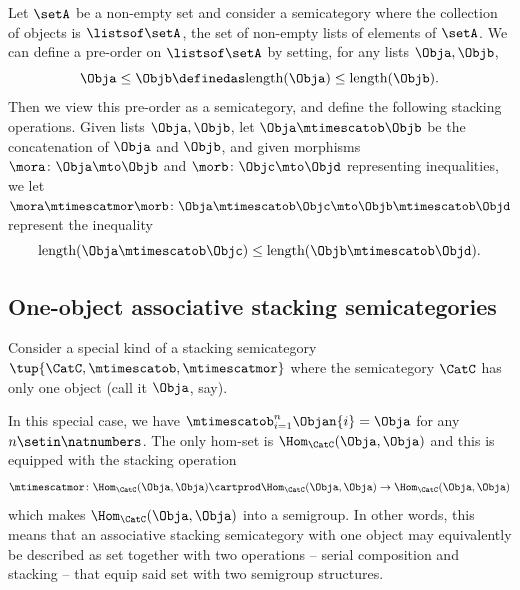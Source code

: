 \begin{example}\label{ex:assoc-stacking-semicat-lists-concat}
    Let $\setA$ be a non-empty set and consider a semicategory where the collection of objects is $ \listsof \setA$, the set of non-empty lists of elements of $\setA$.
    We can define a pre-order on $\listsof \setA$ by setting, for any lists $\Obja, \Objb$,
    \begin{equation}
        \Obja \leq \Objb \definedas \text{length}(\Obja) \leq \text{length}(\Objb).
    \end{equation}
    Then we view this pre-order as a semicategory, and define the following stacking operations.
    Given lists $\Obja, \Objb$, let $\Obja \mtimescatob \Objb$ be the concatenation of $\Obja$ and $\Objb$, and given morphisms $\mora \colon \Obja \mto \Objb$ and $\morb \colon \Objc \mto \Objd$ representing inequalities, we let $\mora \mtimescatmor \morb \colon \Obja \mtimescatob \Objc \mto \Objb \mtimescatob \Objd$ represent the inequality
    \begin{equation}
        \text{length}(\Obja \mtimescatob \Objc) \leq \text{length}(\Objb \mtimescatob \Objd).
    \end{equation}

\end{example}


\subsection{One-object associative stacking semicategories}

Consider a special kind of a stacking semicategory $\tup{\CatC, \mtimescatob, \mtimescatmor}$ where the semicategory $\CatC$ has only one object (call it $\Obja$, say).

In this special case, we have $\mtimescatob_{i=1}^n \Objan{i} = \Obja$ for any $n \setin \natnumbers$.
The only hom-set is $\Hom_\CatC(\Obja, \Obja)$ and this is equipped with the stacking operation
\begin{equation}
    \mtimescatmor \colon \Hom_\CatC(\Obja, \Obja) \cartprod \Hom_\CatC(\Obja, \Obja) \to \Hom_\CatC(\Obja, \Obja)
\end{equation}
which makes $\Hom_\CatC(\Obja, \Obja)$ into a semigroup.
In other words, this means that an associative stacking semicategory with one object may equivalently be described as set together with two operations -- serial composition and stacking -- that equip said set with two semigroup structures.

